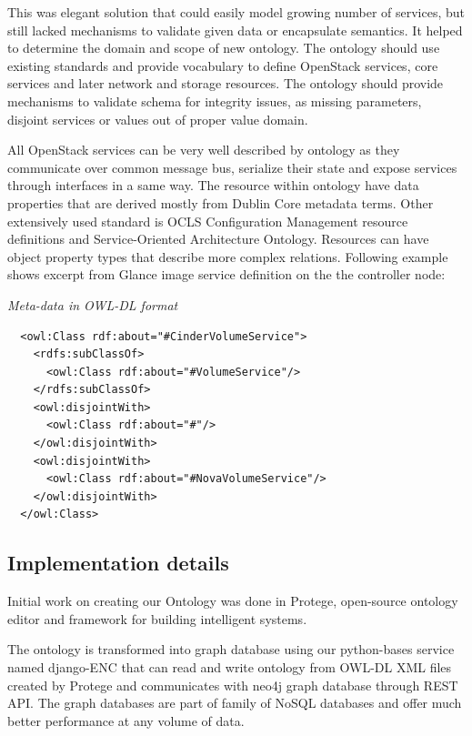 This was elegant solution that could easily model growing number of services, but still lacked mechanisms to validate given data or encapsulate semantics. It helped to determine the domain and scope of new ontology. The ontology should use existing standards and provide vocabulary to define OpenStack services, core services and later network and storage resources. The ontology should provide mechanisms to validate schema for integrity issues, as missing parameters, disjoint services or values out of proper value domain.


All OpenStack services can be very well described by ontology as they communicate over common message bus, serialize their state and expose services through interfaces in a same way. The resource within ontology have data properties that are derived mostly from Dublin Core metadata terms. Other extensively used standard is OCLS Configuration Management resource definitions and Service-Oriented Architecture Ontology.  Resources can have object property types that describe more complex relations. Following example shows excerpt from Glance image service definition on the the controller node: 

\medskip

\noindent
{\it Meta-data in OWL-DL format}
\begin{verbatim}
  <owl:Class rdf:about="#CinderVolumeService">
    <rdfs:subClassOf>
      <owl:Class rdf:about="#VolumeService"/>
    </rdfs:subClassOf>
    <owl:disjointWith>
      <owl:Class rdf:about="#"/>
    </owl:disjointWith>
    <owl:disjointWith>
      <owl:Class rdf:about="#NovaVolumeService"/>
    </owl:disjointWith>
  </owl:Class>
\end{verbatim}
\noindent

\subsection{Implementation details}


Initial work on creating our Ontology was done in Protege, open-source ontology editor and framework for building intelligent systems.

The ontology is transformed into graph database using our python-bases service named django-ENC that can read and write ontology from OWL-DL XML files created by Protege and communicates with neo4j graph database through REST API. The graph databases are part of family of NoSQL databases and offer much better performance at any volume of data.


